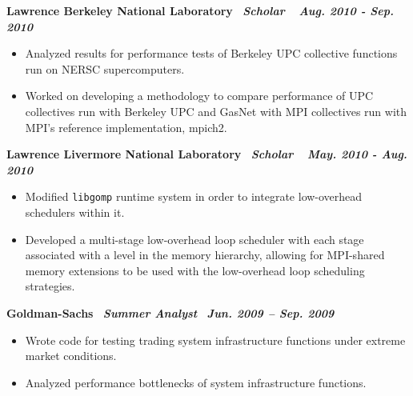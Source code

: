 {\bf Lawrence Berkeley National Laboratory$\>$$\>$$\>$$\>$\textit{Scholar} $\>$$\>$$\>$$\>$\textit{Aug. 2010 - Sep. 2010}}
\begin{itemize}
\item Analyzed results for performance tests of Berkeley UPC collective functions run on NERSC supercomputers.
\item Worked on developing a methodology to compare performance of UPC collectives run with Berkeley UPC and GasNet with MPI collectives run with MPI's reference implementation, mpich2.
\end{itemize}

{\bf Lawrence Livermore National Laboratory$\>$$\>$$\>$$\>$\textit{Scholar}$\>$$\>$$\>$$\>$ \textit{May. 2010 - Aug. 2010}}
\begin{itemize}
\item Modified {\tt libgomp} runtime system in order to integrate low-overhead schedulers within it.
\item Developed a multi-stage low-overhead loop scheduler with each stage associated with a level in the memory hierarchy, allowing for MPI-shared memory extensions to be used with the low-overhead loop scheduling strategies.
\end{itemize}

{\bf Goldman-Sachs$\>\>\>\>$\textit{Summer Analyst}$\>\>\>\>$\textit{Jun. 2009 – Sep. 2009}}
\vspace*{-0.0in}
\begin{itemize}
\item Wrote code for testing trading system infrastructure functions under extreme market conditions.
\item Analyzed performance bottlenecks of system infrastructure functions.
\end{itemize}


